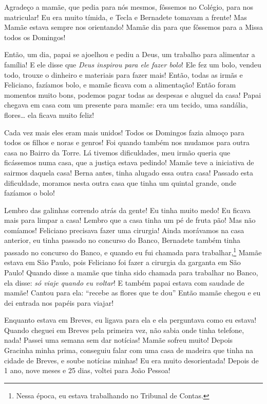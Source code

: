 \documentclass[
  brazil,
  a6paper,
  oneside,
  landscape,
  14pt]{scrbook}
\begin{document}
Agradeço a mamãe, que pedia para nós mesmos, fôssemos no Colégio, para
nos matricular! Eu era muito tímida, e Tecla e Bernadete tomavam a
frente! Mas Mamãe estava sempre nos orientando! Mamãe dia para que
fôssemos para a Missa todos os Domingos!

Então, um dia, papai se ajoelhou e pediu a Deus, um trabalho para
alimentar a família! E ele disse que \emph{Deus inspirou para ele fazer
bolo}! Ele fez um bolo, vendeu todo, trouxe o dinheiro e materiais para
fazer mais! Então, todas as irmãs e Feliciano, fazíamos bolo, e mamãe
ficava com a alimentação! Então foram momentos muito bons, podemos pagar
todas as despesas e aluguel da casa! Papai chegava em casa com um
presente para mamãe: era um tecido, uma sandália, flores\ldots{} ela
ficava muito feliz!

Cada vez mais eles eram mais unidos! Todos os Domingos fazia almoço para
todos os filhos e noras e genros! Foi quando também nos mudamos para
outra casa no Bairro da Torre. Lá tivemos dificuldades, meu irmão queria
que ficássemos numa casa, que a justiça estava pedindo! Mamãe teve a
iniciativa de sairmos daquela casa! Berna antes, tinha alugado essa
outra casa! Passado esta dificuldade, moramos nesta outra casa que tinha
um quintal grande, onde fazíamos o bolo!

Lembro das galinhas correndo atrás da gente! Eu tinha muito medo! Eu
ficava mais para limpar a casa! Lembro que a casa tinha um pé de fruta
pão! Mas não comíamos! Feliciano precisava fazer uma cirurgia! Ainda
morávamos na casa anterior, eu tinha passado no concurso do Banco,
Bernadete também tinha passado no concurso do Banco, e quando eu fui
chamada para trabalhar,\footnote{Nessa época, eu estava trabalhando no
  Tribunal de Contas.} Mamãe estava em São Paulo, pois Feliciano foi
fazer a cirurgia da garganta em São Paulo! Quando disse a mamãe que
tinha sido chamada para trabalhar no Banco, ela disse: \emph{só viaje
quando eu voltar}! E também papai estava com saudade de mamãe! Cantou
para ela: ``recebe as flores que te dou'' Então mamãe chegou e eu dei
entrada nos papéis para viajar!

Enquanto estava em Breves, eu ligava para ela e ela perguntava como eu
estava! Quando cheguei em Breves pela primeira vez, não sabia onde tinha
telefone, nada! Passei uma semana sem dar notícias! Mamãe sofreu muito!
Depois Gracinha minha prima, conseguiu falar com uma casa de madeira que
tinha na cidade de Breves, e soube notícias minhas! Eu era muito
desorientada! Depois de 1 ano, nove meses e 25 dias, voltei para João
Pessoa!
\end{document}
